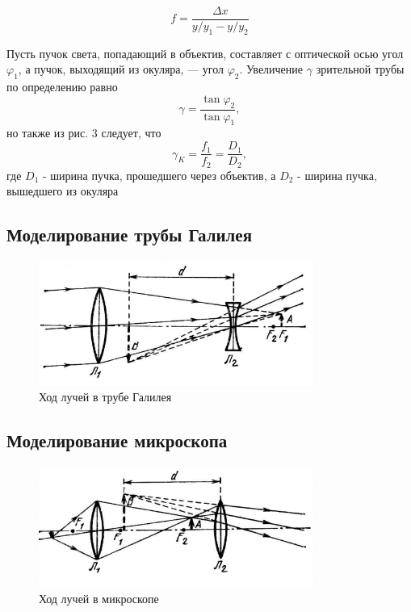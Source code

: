 \documentclass[a4paper,12pt]{article}
\theoremstyle{definition}
\begin{document}
\begin{equation}
    f = \frac{\Delta x}{y / y_1 - y / y_2}    
\end{equation}

Пусть пучок света, попадающий в объектив, составляет с оптической осью угол $\varphi_1$, а пучок, выходящий из окуляра, — угол $\varphi_2$. Увеличение $\gamma$ зрительной трубы по определению равно
\begin{equation}
    \gamma = \frac{\tan \varphi_2}{\tan \varphi_1},
\end{equation}
но также из рис. 3 следует, что 
\begin{equation}
    \gamma_K = \frac{f_1}{f_2} = \frac{D_1}{D_2},
\end{equation}
где $D_1$ - ширина пучка, прошедшего через объектив, а $D_2$ - ширина пучка, вышедшего из окуляра

\subsection{Моделирование трубы Галилея}

    \begin{figure}[H]
    \centering
    \includegraphics[width=9cm]{gal.PNG}
    \caption{Ход лучей в трубе Галилея}
    \label{fig:vac}
\end{figure}

\subsection{Моделирование микроскопа}

    \begin{figure}[h]
    \centering
    \includegraphics[width=9cm]{micro.PNG}
    \caption{Ход лучей в микроскопе}
    \label{fig:vac}
\end{figure}
\end{document}
